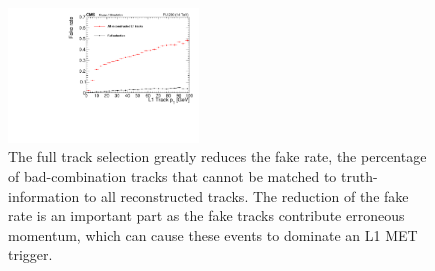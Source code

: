 \begin{figure}
\includegraphics[width=0.45\textwidth ]{StopSamplePUFakeRatePt.pdf}
\caption{The full track selection greatly reduces the fake rate, the percentage of bad-combination tracks that cannot be matched to truth-information to all reconstructed tracks. The reduction of the fake rate is an important part as the fake tracks contribute erroneous momentum, which can cause these events to dominate an L1 MET trigger.}
\label{fig:TkFakeRate}
\end{figure}

